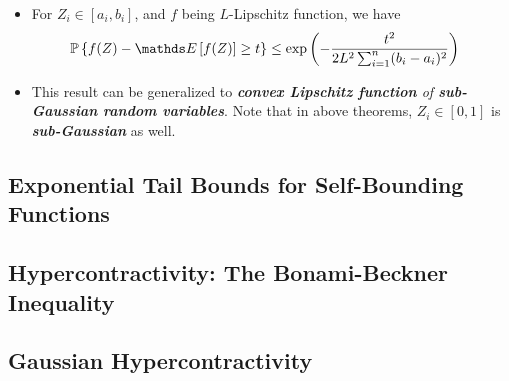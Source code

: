 \documentclass[11pt]{article}
\begin{document}
\begin{itemize}
\item \begin{remark}
For $Z_i \in [a_i, b_i]$, and $f$ being $L$-Lipschitz function, we have
\begin{align*}
\bP\set{f(Z) - \E{}{f(Z)} \ge t } &\le \exp\paren{- \frac{t^2}{2L^2\sum_{i=1}^n(b_i - a_i)^2}}
\end{align*}
\end{remark}

\item \begin{remark}
This result can be generalized to \emph{\textbf{convex Lipschitz function} of \textbf{sub-Gaussian random variables}}. Note that in above theorems, $Z_i \in [0, 1]$ is \emph{\textbf{sub-Gaussian}} as well. 
\end{remark}
\end{itemize}

\subsection{Exponential Tail Bounds for Self-Bounding Functions}

\subsection{Hypercontractivity: The Bonami-Beckner Inequality}
\subsection{Gaussian Hypercontractivity}



\newpage


\end{document}
